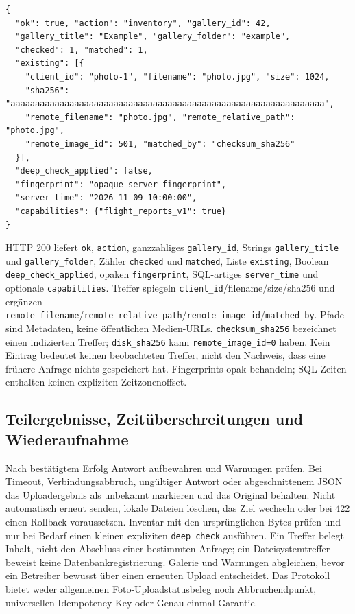 \documentclass[11pt,a4paper]{article}
\newcommand{\codeword}[1]{\nolinkurl{#1}}
\begin{document}
\begin{lstlisting}[language={}]
{
  "ok": true, "action": "inventory", "gallery_id": 42,
  "gallery_title": "Example", "gallery_folder": "example",
  "checked": 1, "matched": 1,
  "existing": [{
    "client_id": "photo-1", "filename": "photo.jpg", "size": 1024,
    "sha256": "aaaaaaaaaaaaaaaaaaaaaaaaaaaaaaaaaaaaaaaaaaaaaaaaaaaaaaaaaaaaaaaa",
    "remote_filename": "photo.jpg", "remote_relative_path": "photo.jpg",
    "remote_image_id": 501, "matched_by": "checksum_sha256"
  }],
  "deep_check_applied": false,
  "fingerprint": "opaque-server-fingerprint",
  "server_time": "2026-11-09 10:00:00",
  "capabilities": {"flight_reports_v1": true}
}
\end{lstlisting}

HTTP 200 liefert \codeword{ok}, \codeword{action}, ganzzahliges \codeword{gallery_id},
Strings \codeword{gallery_title} und \codeword{gallery_folder}, Zähler \codeword{checked}
und \codeword{matched}, Liste \codeword{existing}, Boolean \codeword{deep_check_applied},
opaken \codeword{fingerprint}, SQL-artiges \codeword{server_time} und optionale
\codeword{capabilities}. Treffer spiegeln \codeword{client_id}/filename/size/sha256 und
ergänzen
\codeword{remote_filename}/\codeword{remote_relative_path}/\codeword{remote_image_id}/\codeword{matched_by}.
Pfade sind Metadaten, keine öffentlichen Medien-URLs. \codeword{checksum_sha256} bezeichnet
einen indizierten Treffer; \codeword{disk_sha256} kann \codeword{remote_image_id=0} haben.
Kein Eintrag bedeutet keinen beobachteten Treffer, nicht den Nachweis, dass eine frühere
Anfrage nichts gespeichert hat. Fingerprints opak behandeln; SQL-Zeiten enthalten keinen
expliziten Zeitzonenoffset.

\subsection{\texorpdfstring{Teilergebnisse, Zeitüberschreitungen und Wiederaufnahme}{Teilergebnisse, Zeitüberschreitungen und Wiederaufnahme}}

\label{api352:recovery}

Nach bestätigtem Erfolg Antwort aufbewahren und Warnungen prüfen. Bei Timeout,
Verbindungsabbruch, ungültiger Antwort oder abgeschnittenem JSON das Uploadergebnis als
unbekannt markieren und das Original behalten. Nicht automatisch erneut senden, lokale
Dateien löschen, das Ziel wechseln oder bei 422 einen Rollback voraussetzen. Inventar mit
den ursprünglichen Bytes prüfen und nur bei Bedarf einen kleinen expliziten
\codeword{deep_check} ausführen. Ein Treffer belegt Inhalt, nicht den Abschluss einer
bestimmten Anfrage; ein Dateisystemtreffer beweist keine Datenbankregistrierung. Galerie und
Warnungen abgleichen, bevor ein Betreiber bewusst über einen erneuten Upload entscheidet.
Das Protokoll bietet weder allgemeinen Foto-Uploadstatusbeleg noch Abbruchendpunkt,
universellen Idempotency-Key oder Genau-einmal-Garantie.
\end{document}
